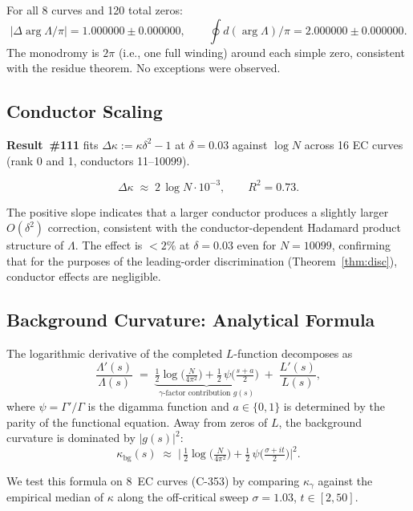 \documentclass[11pt, a4paper]{article}
\theoremstyle{plain}
\theoremstyle{definition}
\begin{document}
\medskip
\noindent For all 8 curves and 120 total zeros:
\[
  |\Delta\!\arg\Lambda / \pi| = 1.000000\pm 0.000000,
  \qquad
  \oint d(\arg\Lambda)/\pi = 2.000000\pm 0.000000.
\]
The monodromy is $2\pi$ (i.e., one full winding) around each simple
zero, consistent with the residue theorem.  No exceptions were observed.


\subsection{Conductor Scaling}
\label{ssec:conductor}

\textbf{Result~\#111} fits $\Delta\kappa := \kappa\delta^{2}-1$ at
$\delta=0.03$ against $\log N$ across 16 EC curves
(rank 0 and 1, conductors 11--10099).

\[
  \Delta\kappa \;\approx\; 2\,\log N \cdot 10^{-3}, \qquad R^{2}=0.73.
\]

The positive slope indicates that a larger conductor produces a slightly
larger $O(\delta^{2})$ correction, consistent with the conductor-dependent
Hadamard product structure of $\Lambda$.  The effect is $<2\%$ at
$\delta=0.03$ even for $N=10099$, confirming that for the purposes of
the leading-order discrimination (Theorem~\ref{thm:disc}), conductor
effects are negligible.


\subsection{Background Curvature: Analytical Formula}
\label{ssec:kappabg}

The logarithmic derivative of the completed $L$-function decomposes as
\[
  \frac{\Lambda'(s)}{\Lambda(s)}
  \;=\; \underbrace{\tfrac{1}{2}\log\!\bigl(\tfrac{N}{4\pi^{2}}\bigr)
        + \tfrac{1}{2}\,\psi\!\bigl(\tfrac{s+a}{2}\bigr)}_{\displaystyle
        \gamma\text{-factor contribution } g(s)}
  \;+\; \frac{L'(s)}{L(s)},
\]
where $\psi = \Gamma'/\Gamma$ is the digamma function and $a\in\{0,1\}$
is determined by the parity of the functional equation.  Away from
zeros of $L$, the background curvature is dominated by $|g(s)|^{2}$:
\[
  \kappa_{\mathrm{bg}}(s)
  \;\approx\;
  \bigl|\,\tfrac{1}{2}\log\!\bigl(\tfrac{N}{4\pi^{2}}\bigr)
  + \tfrac{1}{2}\,\psi\!\bigl(\tfrac{\sigma+it}{2}\bigr)\bigr|^{2}.
\]

We test this formula on 8~EC curves (C-353) by comparing $\kappa_{\gamma}$
against the empirical median of $\kappa$ along the off-critical sweep
$\sigma=1.03$, $t\in[2,50]$.
\end{document}
